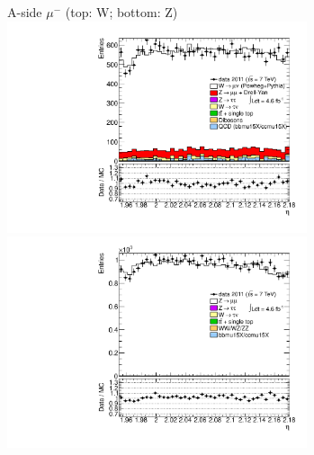 {{
A-side $\mu^{-}$ (top: W; bottom: Z)
\centering
\includegraphics[width=0.66\textwidth]{dates/20130306/figures/etaphi/WpItoI_10_A_stack_l_eta_NEG} \\
\includegraphics[width=0.66\textwidth]{dates/20130306/figures/etaphi/Z_10_A_stack_lN_eta_ALL.pdf} 

\cole
}



 {
\colb[T]

}}
